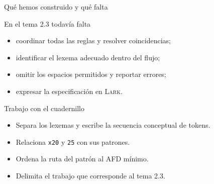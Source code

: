 \documentclass[11pt,spanish]{beamer}
\newcommand{\actividad}[1]{\textbf{\textcolor{Rojo}{#1}}}
\begin{document}
\begin{frame}{Qué hemos construido y qué falta}
\vfill

\begin{center}
\end{center}

\bigskip
\begin{block}{En el tema 2.3 todavía falta}
\small
\begin{itemize}
\item coordinar todas las reglas y resolver coincidencias;
\item identificar el lexema adecuado dentro del flujo;
\item omitir los espacios permitidos y reportar errores;
\item expresar la especificación en \textsc{Lark}.
\end{itemize}
\end{block}

\vfill
\end{frame}

\begin{frame}{Trabajo con el cuadernillo}
\vfill

\begin{center}
\end{center}

\bigskip
\begin{itemize}
\item Separa los lexemas y escribe la secuencia conceptual de tokens.
\item Relaciona \texttt{x20} y \texttt{25} con sus patrones.
\item Ordena la ruta del patrón al AFD mínimo.
\item Delimita el trabajo que corresponde al tema 2.3.
\end{itemize}

\vfill
\end{frame}
\end{document}
